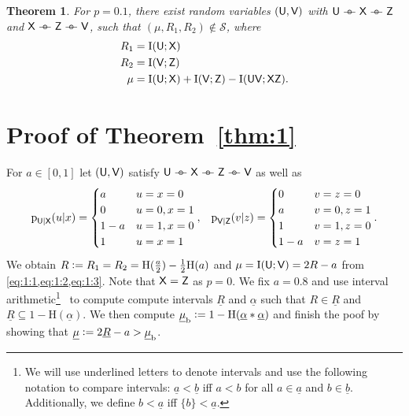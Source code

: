\documentclass[a4paper,12pt]{scrartcl}
\newcommand{\ul}[1]{\ensuremath{\underline{#1}}}
\newcommand{\rv}[1]{\ensuremath{\mathsf{\uppercase{#1}}}}
\newcommand{\SSS}{\ensuremath{\mathcal S}}
\newcommand{\defas}{\vcentcolon=}
\def\barcirc{\mathrel{\barcirci}}
\def\barcirci{{%
    \setbox0\hbox{\ensuremath{\relbar\!\!\relbar}}%
    \rlap{\hbox to \wd0{\hss\ensuremath{\circ}\hss}}\box0
}}
\newcommand{\mkv}{\ensuremath{\barcirc}}
\newcommand{\binEnt}[1]{\ensuremath{\mathrm{H}(#1)}}
\newcommand{\mutInf}[2]{\ensuremath{\mathrm{I}(#1;#2)}}
\newtheorem{theorem}{Theorem}
\begin{document}
\begin{theorem}
  \label{thm:2}
  For $p=0.1$, there exist random variables $(\rv u, \rv v)$ with $\rv u \mkv \rv x \mkv \rv z$ and $\rv x \mkv \rv z \mkv \rv v$, such that $(\mu, R_1, R_2) \notin \SSS$, where
  \begin{align}
    R_1 &= \mutInf{\rv u}{\rv x} \\
    R_2 &= \mutInf{\rv v}{\rv z} \\
    \mu &= \mutInf{\rv u}{\rv x} + \mutInf{\rv v}{\rv z} - \mutInf{\rv u \rv v}{\rv x \rv z} .
  \end{align}
\end{theorem}

\section{Proof of Theorem~\ref{thm:1}}
\label{sec:proof-1}

For $a \in [0,1]$ let $(\rv u, \rv v)$ satisfy $\rv u \mkv \rv x \mkv \rv z \mkv \rv v$ as well as
\begin{align}
  \textrm{p}_{\rv u | \rv x}(u | x) =
  \begin{cases}
    a & u=x=0 \\
    0 & u=0, x=1 \\
    1-a & u=1, x=0 \\
    1 & u=x=1
  \end{cases} ,
      &&
         \textrm{p}_{\rv v | \rv z}(v | z) =
         \begin{cases}
           0 & v=z=0 \\
           a & v=0, z=1 \\
           1 & v=1, z=0 \\
           1-a & v=z=1
         \end{cases} .
\end{align}
We obtain $R \defas R_1 = R_2 = \binEnt{\frac{a}{2}} - \frac{1}{2}\binEnt{a}$ and $\mu = \mutInf{\rv u}{\rv v} = 2R - a$ from \cref{eq:1:1,eq:1:2,eq:1:3}. Note that $\rv x = \rv z$ as $p = 0$.
We fix $a = 0.8$ and use interval arithmetic\footnote{We will use underlined letters to denote intervals and use the following notation to compare intervals: $\ul a < \ul b$ iff $a < b$ for all $a \in \ul a$ and $b \in \ul b$. Additionally, we define $b < \ul a$ iff $\{b\} < \ul a$.}~\cite{Moore2009Introduction} to compute compute intervals $\ul R$ and $\ul\alpha$ such that $R \in \ul R$ and $\ul R \subseteq 1-\binEnt{\ul\alpha}$.
We then compute $\ul\mu_{\text{b}} \defas 1 - \binEnt{\ul\alpha * \ul\alpha}$ and finish the poof by showing that $\ul\mu \defas 2\ul R - a > \ul\mu_{\text{b}}$.
\end{document}
